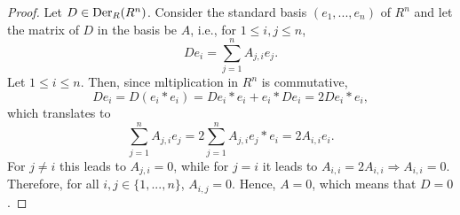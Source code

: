 \begin{proof}
  Let $D \in {\rm Der}_R(R^n)$.
  Consider the standard basis $(e_1, ..., e_n)$ of $R^n$ and let the matrix of
  $D$ in the basis be $A$, i.e., for $1 \leq i, j \leq n$,
  \begin{equation}
    D e_i = \sum_{j = 1}^n A_{j, i} e_j.
  \end{equation}
  Let $1 \leq i \leq n$.
  Then, since mltiplication in $R^n$ is commutative,
  \begin{equation}
    D e_i = D(e_i * e_i) = D e_i * e_i + e_i * D e_i = 2 D e_i * e_i,
  \end{equation}
  which translates to
  \begin{equation}
    \sum_{j = 1}^n A_{j, i} e_j
    = 2 \sum_{j = 1}^n A_{j, i} e_j * e_i
    = 2 A_{i, i} e_i.
  \end{equation}
  For $j \neq i$ this leads to $A_{j, i} = 0$, while for $j = i$ it leads to
  $A_{i, i} = 2 A_{i, i} \Rightarrow A_{i, i} = 0$.
  Therefore, for all $i, j \in \{1, ..., n\}$, $A_{i, j} = 0$.
  Hence, $A = 0$, which means that $D = 0$.
\end{proof}
